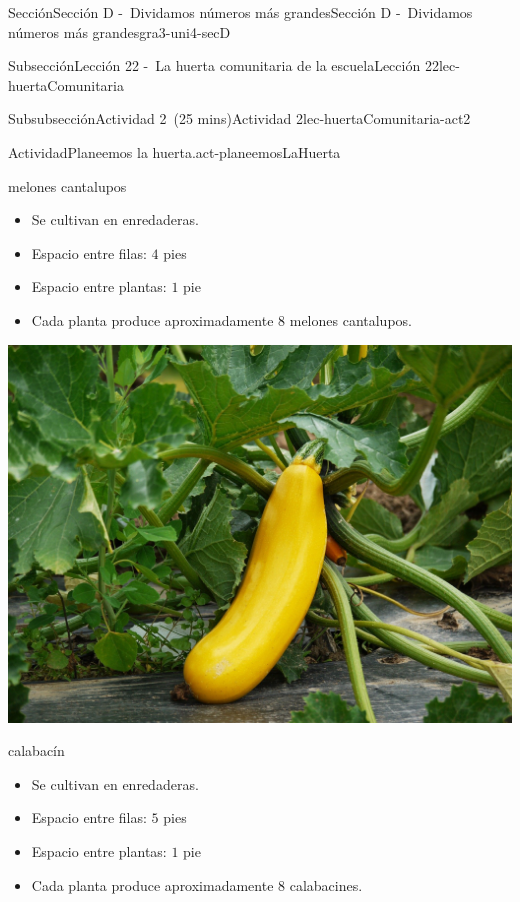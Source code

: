 \documentclass[oneside,10pt,]{article}
\begin{document}
\begin{sectionptx}{Sección}{Sección D -~Dividamos números más grandes}{}{Sección D -~Dividamos números más grandes}{}{}{gra3-uni4-secD}
\begin{subsectionptx}{Subsección}{Lección 22 -~La huerta comunitaria de la escuela}{}{Lección 22}{}{}{lec-huertaComunitaria}
\begin{subsubsectionptx}{Subsubsección}{Actividad 2~(25 mins)}{}{Actividad 2}{}{}{lec-huertaComunitaria-act2}
\begin{activity}{Actividad}{Planeemos la huerta.}{act-planeemosLaHuerta}
\begin{sidebyside}{2}{0.025}{0.025}{0.05}
\begin{sbspanel}{0.45}
%
\par
melones cantalupos%
%
\begin{itemize}[label=\textbullet]
\item{}Se cultivan en enredaderas.%
\item{}Espacio entre filas: \(4\) pies%
\item{}Espacio entre plantas: \(1\) pie%
\item{}Cada planta produce aproximadamente \(8\) melones cantalupos.%
\end{itemize}
\end{sbspanel}%
\end{sidebyside}%
\begin{sidebyside}{2}{0.025}{0.025}{0.05}%
\begin{sbspanel}{0.45}%
\includegraphics[width=\linewidth]{external/jpg-source/3-4-D-22 Act2-calabacin.jpg}
%
\par
calabacín%
%
\begin{itemize}[label=\textbullet]
\item{}Se cultivan en enredaderas.%
\item{}Espacio entre filas: \(5\) pies%
\item{}Espacio entre plantas: \(1\) pie%
\item{}Cada planta produce aproximadamente \(8\) calabacines.%
\end{itemize}
\end{sbspanel}%
\begin{sbspanel}{0.45}%

\end{sbspanel}
\end{sidebyside}
\end{activity}
\end{subsubsectionptx}
\end{subsectionptx}
\end{sectionptx}
\end{document}
